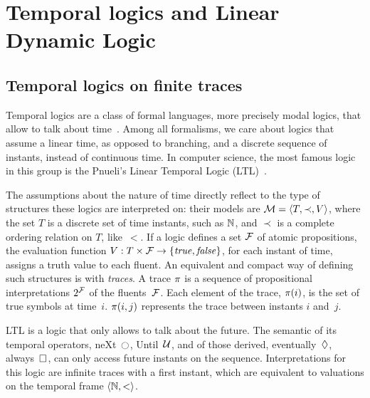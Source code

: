 \section{Temporal logics and Linear Dynamic Logic}

\subsection{Temporal logics on finite traces}

Temporal logics are a class of formal languages, more precisely modal logics,
that allow to talk about time~\cite{bib:temporal-logics-stanford}. Among all
formalisms, we care about logics that assume a linear time, as opposed to
branching, and a discrete sequence of instants, instead of continuous time.
In computer science, the most famous logic in this group is the Pnueli's
Linear Temporal Logic (LTL)~\cite{bib:pnueli-ltl}.

The assumptions about the nature of time directly reflect to the type of
structures these logics are interpreted on: their models are $\mathcal{M} =
\langle T, \prec, V \rangle$, where the set $T$ is a discrete set of time
instants, such as $\mathbb{N}$, and $\prec$ is a complete ordering relation on $T$,
like~$<$. If a logic defines a set $\mathcal{F}$ of atomic propositions, the
evaluation function $V: T \times \mathcal{F} \to \{\text{\textit{true}}, \text{\textit{false}}\}$, for each
instant of time, assigns a truth value to each fluent. An equivalent and
compact way of defining such structures is with \emph{traces}. A trace
$\pi$ is a sequence of propositional interpretations $2^{\mathcal{F}}$ of the 
fluents~$\mathcal{F}$. Each element of the trace, $\pi(i)$, is the set of true
symbols at time~$i$. $\pi(i, j)$ represents the trace between instants $i$
and~$j$.

LTL is a logic that only allows to talk about the future. The semantic of its
temporal operators, neXt~$\next$, Until~$\mathcal{U}$, and of those derived,
eventually~$\lozenge$, always~$\square$, can only access future instants on
the sequence. Interpretations for this logic are infinite traces with a first
instant, which are equivalent to valuations on the temporal frame $\langle \mathbb{N},
< \rangle$.

